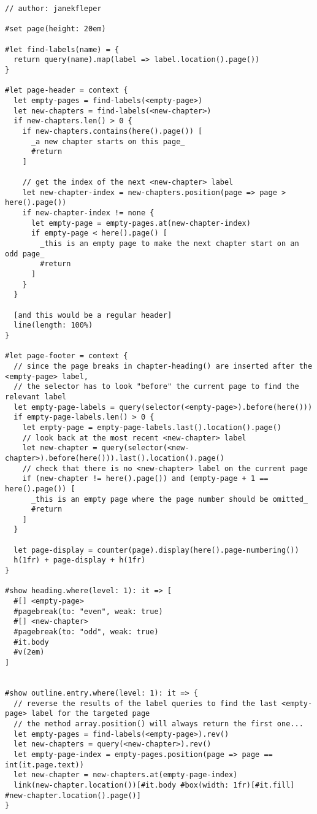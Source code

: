 \begin{verbatim}
// author: janekfleper

#set page(height: 20em)

#let find-labels(name) = {
  return query(name).map(label => label.location().page())
}

#let page-header = context {
  let empty-pages = find-labels(<empty-page>)
  let new-chapters = find-labels(<new-chapter>)
  if new-chapters.len() > 0 {
    if new-chapters.contains(here().page()) [
      _a new chapter starts on this page_
      #return
    ]

    // get the index of the next <new-chapter> label
    let new-chapter-index = new-chapters.position(page => page > here().page())
    if new-chapter-index != none {
      let empty-page = empty-pages.at(new-chapter-index)
      if empty-page < here().page() [
        _this is an empty page to make the next chapter start on an odd page_
        #return
      ]
    }
  }

  [and this would be a regular header]
  line(length: 100%)
}

#let page-footer = context {
  // since the page breaks in chapter-heading() are inserted after the <empty-page> label,
  // the selector has to look "before" the current page to find the relevant label
  let empty-page-labels = query(selector(<empty-page>).before(here()))
  if empty-page-labels.len() > 0 {
    let empty-page = empty-page-labels.last().location().page()
    // look back at the most recent <new-chapter> label
    let new-chapter = query(selector(<new-chapter>).before(here())).last().location().page()
    // check that there is no <new-chapter> label on the current page
    if (new-chapter != here().page()) and (empty-page + 1 == here().page()) [
      _this is an empty page where the page number should be omitted_
      #return
    ]
  }

  let page-display = counter(page).display(here().page-numbering())
  h(1fr) + page-display + h(1fr)
}

#show heading.where(level: 1): it => [
  #[] <empty-page>
  #pagebreak(to: "even", weak: true)
  #[] <new-chapter>
  #pagebreak(to: "odd", weak: true)
  #it.body
  #v(2em)
]


#show outline.entry.where(level: 1): it => {
  // reverse the results of the label queries to find the last <empty-page> label for the targeted page
  // the method array.position() will always return the first one...
  let empty-pages = find-labels(<empty-page>).rev()
  let new-chapters = query(<new-chapter>).rev()
  let empty-page-index = empty-pages.position(page => page == int(it.page.text))
  let new-chapter = new-chapters.at(empty-page-index)
  link(new-chapter.location())[#it.body #box(width: 1fr)[#it.fill] #new-chapter.location().page()]
}


\end{verbatim}
